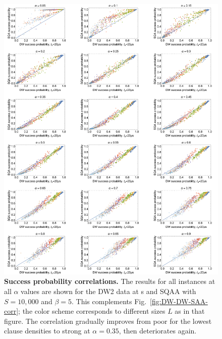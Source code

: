 \begin{figure}
\begin{center}
\includegraphics[width=\textwidth]{chapters/Planted/SQA_10k_vs_DW}
\caption{\textbf{Success probability correlations.} The results for all instances at all $\alpha$ values are shown for the DW2 data at s and SQAA with $S=10,\!000$ and $\beta=5$. This complements Fig.~\ref{fig:DW-DW-SAA-corr}; the color scheme corresponds to different sizes $L$ as in that figure. The correlation gradually improves from poor for the lowest clause densities to strong at $\alpha=0.35$, then deteriorates again.}
\label{fig:corr-SQAvsDW-all-alphas}
\end{center}
\end{figure}


